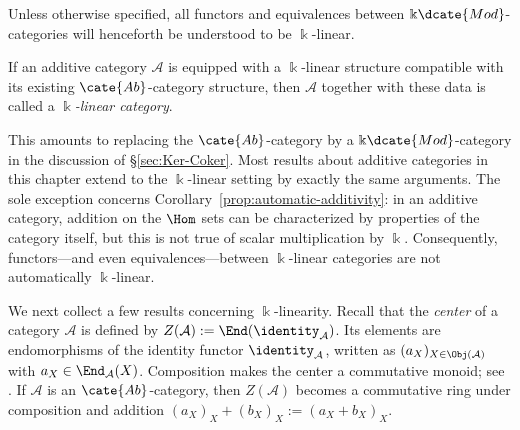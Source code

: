 Unless otherwise specified, all functors and equivalences between
$\Bbbk\dcate{Mod}$-categories will henceforth be understood to be
$\Bbbk$-linear.

\begin{definition}\label{def:k-linear-cat}
	If an additive category $\mathcal{A}$ is equipped with a $\Bbbk$-linear
	structure compatible with its existing $\cate{Ab}$-category structure, then
	$\mathcal{A}$ together with these data is called a
	\emph{$\Bbbk$-linear category}.
\end{definition}

This amounts to replacing the $\cate{Ab}$-category by a
$\Bbbk\dcate{Mod}$-category in the discussion of \S\ref{sec:Ker-Coker}. Most
results about additive categories in this chapter extend to the $\Bbbk$-linear
setting by exactly the same arguments. The sole exception concerns
Corollary~\ref{prop:automatic-additivity}: in an additive category, addition on
the $\Hom$ sets can be characterized by properties of the category itself, but
this is not true of scalar multiplication by $\Bbbk$. Consequently,
functors---and even equivalences---between $\Bbbk$-linear categories are not
automatically $\Bbbk$-linear.

We next collect a few results concerning $\Bbbk$-linearity. Recall that the
\emph{center} of a category $\mathcal{A}$ is defined by
 
$Z(\mathcal{A}) := \End(\identity_{\mathcal{A}})$. Its elements are
endomorphisms of the identity functor $\identity_{\mathcal{A}}$, written as
$(a_X)_{X \in \Obj(\mathcal{A})}$ with
$a_X \in \End_{\mathcal{A}}(X)$. Composition makes the center a commutative
monoid; see \cite[Definition 2.3.8,
Proposition 2.3.9]{Li1}. If $\mathcal{A}$ is an $\cate{Ab}$-category, then
$Z(\mathcal{A})$ becomes a commutative ring under composition and addition
$(a_X)_X + (b_X)_X := (a_X+b_X)_X$.


